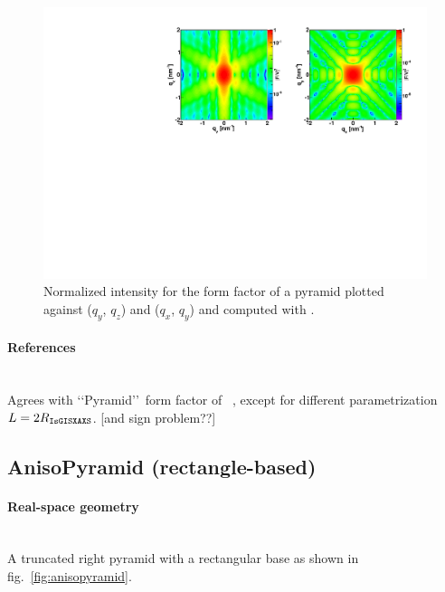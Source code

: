 \begin{figure}[ht]
\begin{center}
\includegraphics[angle=-90,width=\textwidth]{fig/ff/figffpyramid.pdf}
\end{center}
\caption{Normalized intensity for the form factor of a
  pyramid plotted against ($q_y$, $q_z$) and  
  ($q_x$, $q_y$) and computed with  .}
\label{fig:FFPyramidEx}
\end{figure}

\paragraph{References}\strut\\
Agrees with \lq\lq Pyramid\rq\rq\ form factor of \IsGISAXS~\cite{Laz02},
except for different parametrization $L=2R_{\rm{\texttt{IsGISXAXS}}}$.
[and sign problem??]

\newpage
\subsection{AnisoPyramid (rectangle-based)}  

\paragraph{Real-space geometry}\strut\\
A truncated right pyramid with a rectangular base as
shown in fig.~\ref{fig:anisopyramid}.

